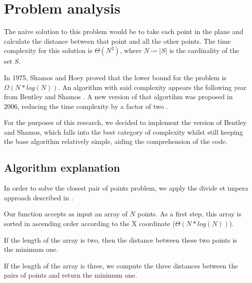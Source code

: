 \section{Problem analysis}
\label{sec:problem_analysis}

The na\"ive solution to this problem would be to take each point
in the plane and calculate the distance between that point and all
the other points. The time complexity for this solution is $\Theta(N^2)$,
where $N\coloneqq|S|$ is the cardinality of the set $S$.


In 1975, Shamos and Hoey proved that the lower bound for the problem is $\Omega(N * log(N))$\cite[§2, theorem 1]{closest_pair_definition}. An algorithm with said complexity appears
the following year from Bentley and Shamos \cite{divide_and_conq_3NlgN}.
A new version of that algortihm was proposed in 2006, reducing the time complexity by a factor of two \cite{ge2006improved}.

For the purposes of this research, we decided to implement the version of Bentley and Shamos, which falls into the best category of complexity whilst still keeping the base algorithm relatively simple, aiding the comprehension of the code.

\subsection{Algorithm explanation}

In order to solve the closest pair of points problem, we apply the divide et impera approach described in \cite{divide_and_conq_3NlgN}.

Our function accepts as input an array of $N$ points. As a first step, this array is sorted in ascending order according to the X coordinate ($\Theta(N*log(N))$).

If the length of the array is two, then the distance between these two points is the minimum one.

If the length of the array is three, we compute the three distances between the pairs of points and return the minimum one.

